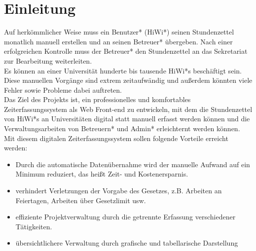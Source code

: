 \section{Einleitung}

Auf herkömmlicher Weise muss ein Benutzer* (HiWi*) seinen Stundenzettel monatlich manuell erstellen und an seinen Betreuer* übergeben. Nach einer erfolgreichen Kontrolle muss der Betreuer* den Stundenzettel an das Sekretariat zur Bearbeitung weiterleiten. \\

Es können an einer Universität hunderte bis tausende HiWi*s beschäftigt sein. Diese manuellen Vorgänge sind extrem zeitaufwändig und außerdem könnten viele Fehler sowie Probleme dabei auftreten.\\

Das Ziel des Projekts ist, ein professionelles und komfortables Zeiterfassungssystem als Web Front-end zu entwickeln, mit dem die Stundenzettel von HiWi*s an Universitäten digital statt manuell erfasst werden können und die Verwaltungsarbeiten von Betreuern* und Admin* erleichternt werden können.\\

Mit diesem digitalen Zeiterfassungssystem sollen folgende Vorteile erreicht werden:\\

\begin{itemize}
	\item Durch die automatische Datenübernahme wird der manuelle Aufwand auf ein Minimum reduziert, das heißt Zeit- und Kostenersparnis.
	\item verhindert Verletzungen der Vorgabe des Gesetzes, z.B. Arbeiten an Feiertagen, Arbeiten über Gesetzlimit usw.
	\item effiziente Projektverwaltung durch die getrennte Erfassung verschiedener Tätigkeiten.
	\item übersichtlichere Verwaltung durch grafische und tabellarische Darstellung

\end{itemize}
